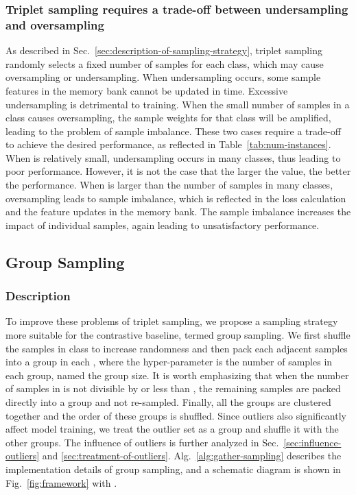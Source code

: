 \documentclass[lettersize,journal]{IEEEtran}
\begin{document}
\subsubsection{Triplet sampling requires a trade-off between undersampling and oversampling} \label{sec:shortcomings-1}
As described in Sec.~\ref{sec:description-of-sampling-strategy}, triplet sampling randomly selects a fixed number of samples for each class, which may cause oversampling or undersampling.
When undersampling occurs, some sample features in the memory bank cannot be updated in time. Excessive undersampling is detrimental to training.
When the small number of samples in a class causes oversampling, the sample weights for that class will be amplified, leading to the problem of sample imbalance.
These two cases require a trade-off to achieve the desired performance, as reflected in Table~\ref{tab:num-instances}.
When  is relatively small, undersampling occurs in many classes, thus leading to poor performance.
However, it is not the case that the larger the value, the better the performance. 
When  is larger than the number of samples in many classes, oversampling leads to sample imbalance, which is reflected in the loss calculation and the feature updates in the memory bank. The sample imbalance increases the impact of individual samples, again leading to unsatisfactory performance.

\subsection{Group Sampling}
\label{sec:group-sampling}

\subsubsection{Description}
\label{sec:description-of-group-sampling}

To improve these problems of triplet sampling, we propose a sampling strategy more suitable for the contrastive baseline, termed group sampling. 
We first shuffle the samples in class  to increase randomness and then pack each  adjacent samples into a group in each , where the hyper-parameter  is the number of samples in each group, named the group size. It is worth emphasizing that when the number of samples in  is not divisible by  or less than , the remaining samples are packed directly into a group and not re-sampled.
Finally, all the groups are clustered together and the order of these groups is shuffled. 
Since outliers also significantly affect model training, we treat the outlier set  as a group and shuffle it with the other groups.
The influence of outliers is further analyzed in Sec.~\ref{sec:influence-outliers} and \ref{sec:treatment-of-outliers}. Alg.~\ref{alg:gather-sampling} describes the implementation details of group sampling, and a schematic diagram is shown in Fig.~\ref{fig:framework} with .
\end{document}
